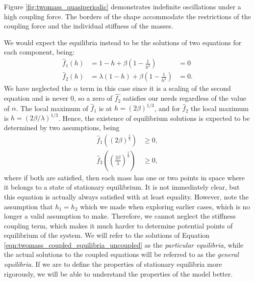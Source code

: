 Figure \ref{fig:twomass_quasiperiodic} demonstrates indefinite oscillations under a high coupling force. 
The borders of the shape accommodate the restrictions of the coupling force and the individual stiffness of the masses.

We would expect the equilibria instead to be the solutions of two equations for each component, being:
\begin{equation}
    \begin{aligned}
        \hat{f}_1(h) &= 1 - h + \beta\left( 1-\frac{1}{h^2} \right) &= 0 \\
        \hat{f}_2(h) &= \lambda(1-h) + \beta\left( 1-\frac{1}{h^2} \right) &= 0.
    \end{aligned}
    \label{eqn:twomass_coupled_equilibria_uncoupled}
\end{equation}
We have neglected the \(\alpha\) term in this case since it is a scaling of the second equation and is never $0$,
so a zero of \(\hat{f_2}\) satisfies our needs regardless of the value of \(\alpha\).
The local maximum of $\hat{f}_1$ is at $h=(2\beta)^{1/3}$,
and for $\hat{f}_2$ the local maximum is $h = (2 \beta / \lambda)^{1/3}$.
Hence, the existence of equilibrium solutions is expected to be determined by two assumptions, being
\begin{align*}
    \hat{f}_1 \left( (2\beta)^\frac{1}{3} \right) &\ge 0, \\
    \hat{f}_2 \left( \left( \frac{2\beta}{\lambda} \right)^\frac{1}{3} \right) &\ge 0,
\end{align*}
where if both are satisfied, then each mass has one or two points in space where it belongs to a state of stationary equilibrium.
It is not immediately clear, but this equation is actually always satisfied with at least equality.
However, note the assumption that \(h_1=h_2\) which we made when exploring earlier cases,
which is no longer a valid assumption to make. 
Therefore, we cannot neglect the stiffness coupling term,
which makes it much harder to determine potential points of equilibrium of the system.
We will refer to the solutions of Equation \ref{eqn:twomass_coupled_equilibria_uncoupled} as the \textit{particular equilibria},
while the actual solutions to the coupled equations will be referred to as the \textit{general equilibria}.
If we are to define the properties of stationary equilibria more rigorously,
we will be able to understand the properties of the model better.
